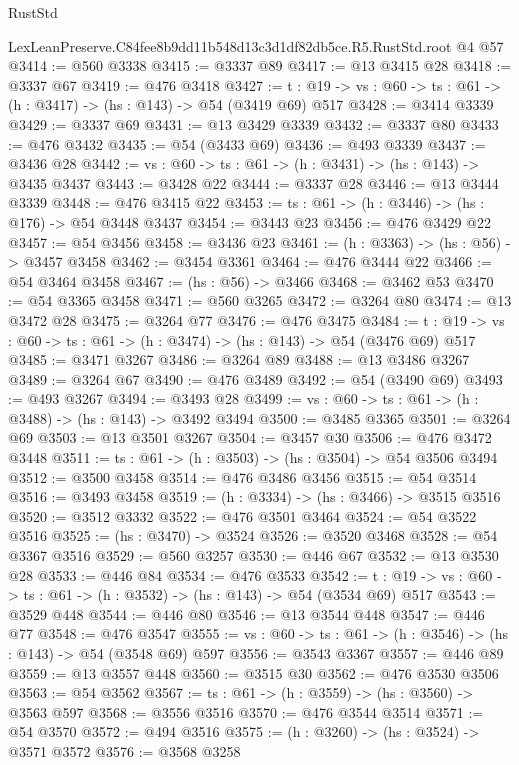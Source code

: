 \begin{lexlean}{RustStd}
\begin{coremodule}
  LexLeanPreserve.C84fee8b9dd11b548d13c3d1df82db5ce.R5.RustStd.root @4 @57
@3414 := @560 @3338
@3415 := @3337 @89
@3417 := @13 @3415 @28
@3418 := @3337 @67
@3419 := @476 @3418
@3427 := {t : @19} -> {vs : @60} -> {ts : @61} -> (h : @3417) -> (hs : @143) -> @54 (@3419 @69) @517
@3428 := @3414 @3339
@3429 := @3337 @69
@3431 := @13 @3429 @3339
@3432 := @3337 @80
@3433 := @476 @3432
@3435 := @54 (@3433 @69)
@3436 := @493 @3339
@3437 := @3436 @28
@3442 := {vs : @60} -> {ts : @61} -> (h : @3431) -> (hs : @143) -> @3435 @3437
@3443 := @3428 @22
@3444 := @3337 @28
@3446 := @13 @3444 @3339
@3448 := @476 @3415 @22
@3453 := {ts : @61} -> (h : @3446) -> (hs : @176) -> @54 @3448 @3437
@3454 := @3443 @23
@3456 := @476 @3429 @22
@3457 := @54 @3456
@3458 := @3436 @23
@3461 := (h : @3363) -> (hs : @56) -> @3457 @3458
@3462 := @3454 @3361
@3464 := @476 @3444 @22
@3466 := @54 @3464 @3458
@3467 := (hs : @56) -> @3466
@3468 := @3462 @53
@3470 := @54 @3365 @3458
@3471 := @560 @3265
@3472 := @3264 @80
@3474 := @13 @3472 @28
@3475 := @3264 @77
@3476 := @476 @3475
@3484 := {t : @19} -> {vs : @60} -> {ts : @61} -> (h : @3474) -> (hs : @143) -> @54 (@3476 @69) @517
@3485 := @3471 @3267
@3486 := @3264 @89
@3488 := @13 @3486 @3267
@3489 := @3264 @67
@3490 := @476 @3489
@3492 := @54 (@3490 @69)
@3493 := @493 @3267
@3494 := @3493 @28
@3499 := {vs : @60} -> {ts : @61} -> (h : @3488) -> (hs : @143) -> @3492 @3494
@3500 := @3485 @3365
@3501 := @3264 @69
@3503 := @13 @3501 @3267
@3504 := @3457 @30
@3506 := @476 @3472 @3448
@3511 := {ts : @61} -> (h : @3503) -> (hs : @3504) -> @54 @3506 @3494
@3512 := @3500 @3458
@3514 := @476 @3486 @3456
@3515 := @54 @3514
@3516 := @3493 @3458
@3519 := (h : @3334) -> (hs : @3466) -> @3515 @3516
@3520 := @3512 @3332
@3522 := @476 @3501 @3464
@3524 := @54 @3522 @3516
@3525 := (hs : @3470) -> @3524
@3526 := @3520 @3468
@3528 := @54 @3367 @3516
@3529 := @560 @3257
@3530 := @446 @67
@3532 := @13 @3530 @28
@3533 := @446 @84
@3534 := @476 @3533
@3542 := {t : @19} -> {vs : @60} -> {ts : @61} -> (h : @3532) -> (hs : @143) -> @54 (@3534 @69) @517
@3543 := @3529 @448
@3544 := @446 @80
@3546 := @13 @3544 @448
@3547 := @446 @77
@3548 := @476 @3547
@3555 := {vs : @60} -> {ts : @61} -> (h : @3546) -> (hs : @143) -> @54 (@3548 @69) @597
@3556 := @3543 @3367
@3557 := @446 @89
@3559 := @13 @3557 @448
@3560 := @3515 @30
@3562 := @476 @3530 @3506
@3563 := @54 @3562
@3567 := {ts : @61} -> (h : @3559) -> (hs : @3560) -> @3563 @597
@3568 := @3556 @3516
@3570 := @476 @3544 @3514
@3571 := @54 @3570
@3572 := @494 @3516
@3575 := (h : @3260) -> (hs : @3524) -> @3571 @3572
@3576 := @3568 @3258

\end{coremodule}
\end{lexlean}
